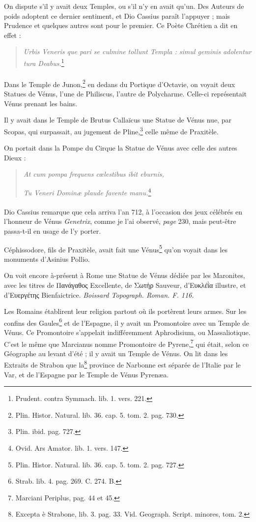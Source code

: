 \documentclass[a4paper, 18pt, oneside]{article}
\begin{document}
On dispute s'il y avait deux Temples, ou s'il n'y en avait qu'un. Des Auteurs de poids adoptent ce dernier sentiment, et Dio Cassius paraît l'appuyer ; mais Prudence et quelques autres sont pour le premier. Ce Poète Chrétien a dit en effet :
\begin{quotation}
\emph{Urbis Veneris que pari se culmine tollunt Templa : simul geminis adolentur tura Deabus.}\footnote{Prudent. contra Symmach. lib. 1. vers. 221.}
\end{quotation}
\paragraph{}
Dans le Temple de Junon,\footnote{Plin. Histor. Natural. lib. 36. cap. 5. tom. 2. pag. 730.} en dedans du Portique d'Octavie, on voyait deux Statues de Vénus, l'une de Philiscus, l'autre de Polycharme. Celle-ci représentait Vénus prenant les bains.

Il y avait dans le Temple de Brutus Callaïcus une Statue de Vénus nue, par Scopas, qui surpassait, au jugement de Pline,\footnote{Plin. ibid. pag. 727.} celle même de Praxitèle.

On portait dans la Pompe du Cirque la Statue de Vénus avec celle des autres Dieux :
\begin{quotation}
\emph{At cum pompa frequens cœlestibus ibit eburnis,}

\hspace*{5mm}\emph{Tu Veneri Dominæ plaude favente manu.}\footnote{Ovid. Ars Amator. lib. 1. vers. 147.}
\end{quotation}
\paragraph{}
Dio Cassius remarque que cela arriva l'an 712, à l'occasion des jeux célébrés en l'honneur de Vénus \emph{Genetrix}, comme je l'ai observé, \emph{page} 230, mais peut-être passa-t-il en usage de l'y porter.

Céphissodore, fils de Praxitèle, avait fait une Vénus\footnote{Plin. Histor. Natural. lib. 36. cap. 5. tom. 2. pag. 727.} qu'on voyait dans les monuments d'Asinius Pollio.

On voit encore à-présent à Rome une Statue de Vénus dédiée par les Maronites, avec les titres de Πανάγαθος Excellente, de Σωτήρ Sauveur, d'Ευκλέῒα illustre, et d'Ευεργέτης Bienfaictrice. \emph{Boissard Topograph. Roman. F. 116.}

Les Romains établirent leur religion partout où ils portèrent leurs armes. Sur les confins des Gaules\footnote{Strab. lib. 4. pag. 269. C. 274. B.} et de l'Espagne, il y avait un Promontoire avec un Temple de Vénus. Ce Promontoire s'appelait indifféremment Aphrodisium, ou Massaliotique. C'est le même que Marcianus nomme Promontoire de Pyrene,\footnote{Marciani Periplus, pag. 44 et 45.} qui était, selon ce Géographe au levant d'été ; il y avait un Temple de Vénus. On lit dans les Extraits de Strabon que la\footnote{Excepta è Strabone, lib. 3. pag. 33. Vid. Geograph. Script. minores, tom. 2.} province de Narbonne est séparée de l'Italie par le Var, et de l'Espagne par le Temple de Vénus Pyrenæa.
\end{document}
